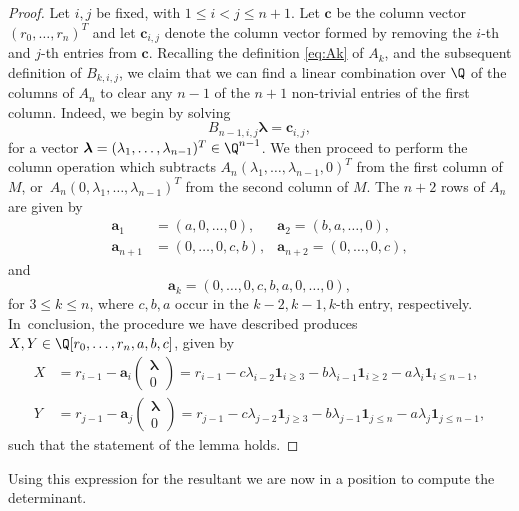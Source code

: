 \begin{proof}
Let $i,j$ be fixed, with $1\leq i<j\leq n+1$.
Let $\boldsymbol{c}$ be the column vector $(r_0,\dots, r_n)^T$
and
let $\boldsymbol{c}_{i,j}$ denote the column vector formed by removing the $i$-th and $j$-th entries from $\boldsymbol{c}$.
Recalling the definition \eqref{eq:Ak} of $A_k$, and the subsequent definition of
$B_{k,i,j}$,
we claim that we can find a linear combination over $\Q$ of the columns of $A_n$ to
clear any $n-1$ of the $n+1$ non-trivial entries of the first column.
Indeed, we begin by solving
\[
B_{n-1,i,j}\boldsymbol{\lambda}=\boldsymbol{c}_{i,j},
\]
for a vector $\boldsymbol{\lambda}=(\lambda_1,\dots,\lambda_{n-1})^T\in\Q^{n-1}$.
We then proceed to perform the column operation which subtracts $A_n
(\lambda_1,\dots,\lambda_{n-1},0)^T$
from the first column of $M$, or~$A_n
(0,\lambda_1,\dots,\lambda_{n-1})^T$ from the second
	column of $M$.
The $n+2$ rows of $A_n$ are given by
\begin{align*}
\boldsymbol{a}_1&=(a,0,\dots,0), &\boldsymbol{a}_2=(b,a,\dots,0),\\
\boldsymbol{a}_{n+1}&=(0,\dots ,0,c,b),
&\boldsymbol{a}_{n+2}=(0,\dots ,0,c),
\end{align*}
and
\[
\boldsymbol{a}_{k}=(0,\dots,0,c,b,a,0,\dots,0),
\]
for $3\leq k\leq n$, where $c,b,a$ occur in the $k-2,k-1,k$-th entry, respectively.
In~conclusion, the procedure we have described produces $X,Y\in\Q[r_0,\dots, r_n,a,b,c]$, given by
\begin{align*}
X&=r_{i-1}-\boldsymbol{a}_{i}\begin{pmatrix}\boldsymbol{\lambda}\\ 0\end{pmatrix}
=r_{i-1}-c\lambda_{i-2}\mathbf{1}_{i\geq 3}-b\lambda_{i-1}\mathbf{1}_{i\geq 2}-a\lambda_{i}\mathbf{1}_{i\leq n-1},\\
Y&=r_{j-1}-\boldsymbol{a}_{j}\begin{pmatrix}\boldsymbol{\lambda}\\ 0\end{pmatrix}=r_{j-1}-c\lambda_{j-2}\mathbf{1}_{j\geq 3}-b\lambda_{j-1}\mathbf{1}_{j\leq n}
-a\lambda_j\mathbf{1}_{j\leq n-1},
\end{align*}
such that the statement of the lemma holds.
\end{proof}

Using this expression for the resultant we are now in a position to compute the determinant.

